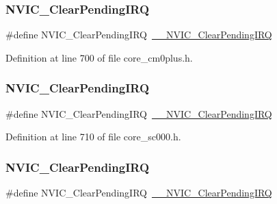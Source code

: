 \subsubsection{\texorpdfstring{N\+V\+I\+C\+\_\+\+Clear\+Pending\+I\+RQ}{NVIC\_ClearPendingIRQ}\hspace{0.1cm}{\footnotesize\ttfamily [3/13]}}
{\footnotesize\ttfamily \#define N\+V\+I\+C\+\_\+\+Clear\+Pending\+I\+RQ~\hyperlink{group___c_m_s_i_s___core___n_v_i_c_functions_ga562a86dbdf14827d0fee8fdafb04d191}{\+\_\+\+\_\+\+N\+V\+I\+C\+\_\+\+Clear\+Pending\+I\+RQ}}



Definition at line 700 of file core\+\_\+cm0plus.\+h.

\mbox{\label{group___c_m_s_i_s___core___n_v_i_c_functions_ga590cf113000a079b1f0ea3dcd5b5316c}} 
\subsubsection{\texorpdfstring{N\+V\+I\+C\+\_\+\+Clear\+Pending\+I\+RQ}{NVIC\_ClearPendingIRQ}\hspace{0.1cm}{\footnotesize\ttfamily [4/13]}}
{\footnotesize\ttfamily \#define N\+V\+I\+C\+\_\+\+Clear\+Pending\+I\+RQ~\hyperlink{group___c_m_s_i_s___core___n_v_i_c_functions_ga562a86dbdf14827d0fee8fdafb04d191}{\+\_\+\+\_\+\+N\+V\+I\+C\+\_\+\+Clear\+Pending\+I\+RQ}}



Definition at line 710 of file core\+\_\+sc000.\+h.

\mbox{\label{group___c_m_s_i_s___core___n_v_i_c_functions_ga590cf113000a079b1f0ea3dcd5b5316c}} 
\subsubsection{\texorpdfstring{N\+V\+I\+C\+\_\+\+Clear\+Pending\+I\+RQ}{NVIC\_ClearPendingIRQ}\hspace{0.1cm}{\footnotesize\ttfamily [5/13]}}
{\footnotesize\ttfamily \#define N\+V\+I\+C\+\_\+\+Clear\+Pending\+I\+RQ~\hyperlink{group___c_m_s_i_s___core___n_v_i_c_functions_ga562a86dbdf14827d0fee8fdafb04d191}{\+\_\+\+\_\+\+N\+V\+I\+C\+\_\+\+Clear\+Pending\+I\+RQ}}



